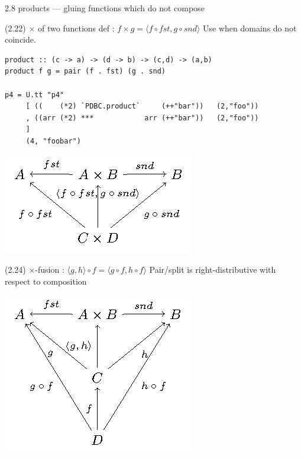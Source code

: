 \documentclass[presentation]{beamer}
\begin{document}
\begin{frame}[fragile,label=sec-7]{2.8 products --- gluing functions which do not compose}
\begin{block}{(2.22) $\times$ of two functions def : $f \times g = \langle f \circ fst, g \circ snd \rangle$}
Use when domains do not coincide.

\begin{verbatim}
product :: (c -> a) -> (d -> b) -> (c,d) -> (a,b)
product f g = pair (f . fst) (g . snd)

p4 = U.tt "p4"
     [ ((    (*2) `PDBC.product`     (++"bar"))   (2,"foo"))
     , ((arr (*2) ***            arr (++"bar"))   (2,"foo"))
     ]
     (4, "foobar")
\end{verbatim}

\includegraphics[width=.9\linewidth]{./product.png}
\end{block}

\begin{block}{(2.24) $\times$-fusion : $\langle g,h \rangle \circ f = \langle g \circ f, h \circ f \rangle$}
Pair/split is right-distributive with respect to composition

\includegraphics[width=.9\linewidth]{./product-fusion.png}


\end{block}
\end{frame}
\end{document}
